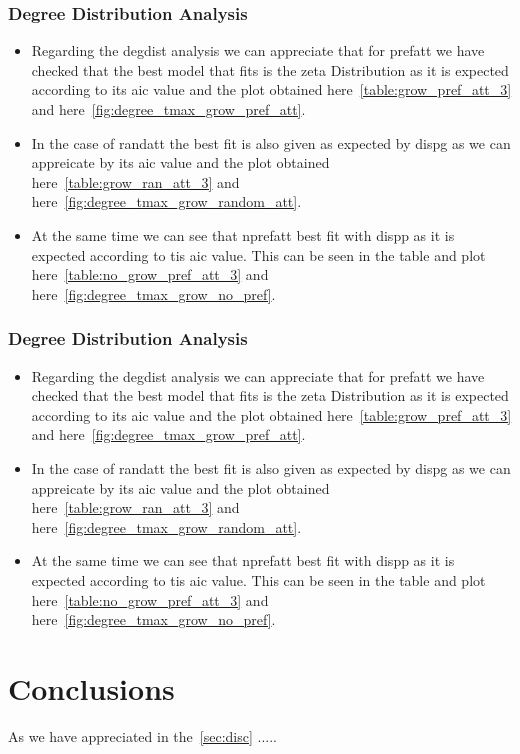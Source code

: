 \documentclass[12pt, a4paper]{article}
\begin{document}
\subsubsection{Degree Distribution Analysis}
\begin{itemize}
    \item Regarding the \acrshort{degdist} analysis we can appreciate that for \acrshort{prefatt} we have checked that the best model that fits is the \acrshort{zeta} Distribution as
    it is expected according to its \acrshort{aic} value and the plot obtained here~\ref{table:grow_pref_att_3} and here~\ref{fig:degree_tmax_grow_pref_att}.
    \item In the case of \acrshort{randatt} the best fit is also given as expected by \acrshort{dispg} as we can appreicate by its \acrshort{aic} value and the plot obtained here~\ref{table:grow_ran_att_3} and here~\ref{fig:degree_tmax_grow_random_att}.
    \item At the same time we can see that \acrshort{nprefatt} best fit with \acrshort{dispp} as it is expected according to tis \acrshort{aic} value. This can be seen in the table and plot here~\ref{table:no_grow_pref_att_3} and here~\ref{fig:degree_tmax_grow_no_pref}.
\end{itemize}

\subsubsection{Degree Distribution Analysis}
\begin{itemize}
    \item Regarding the \acrshort{degdist} analysis we can appreciate that for \acrshort{prefatt} we have checked that the best model that fits is the \acrshort{zeta} Distribution as
    it is expected according to its \acrshort{aic} value and the plot obtained here~\ref{table:grow_pref_att_3} and here~\ref{fig:degree_tmax_grow_pref_att}.
    \item In the case of \acrshort{randatt} the best fit is also given as expected by \acrshort{dispg} as we can appreicate by its \acrshort{aic} value and the plot obtained here~\ref{table:grow_ran_att_3} and here~\ref{fig:degree_tmax_grow_random_att}.
    \item At the same time we can see that \acrshort{nprefatt} best fit with \acrshort{dispp} as it is expected according to tis \acrshort{aic} value. This can be seen in the table and plot here~\ref{table:no_grow_pref_att_3} and here~\ref{fig:degree_tmax_grow_no_pref}.
\end{itemize}

\section{Conclusions}
As we have appreciated in the~\ref{sec:disc} .....
\end{document}
